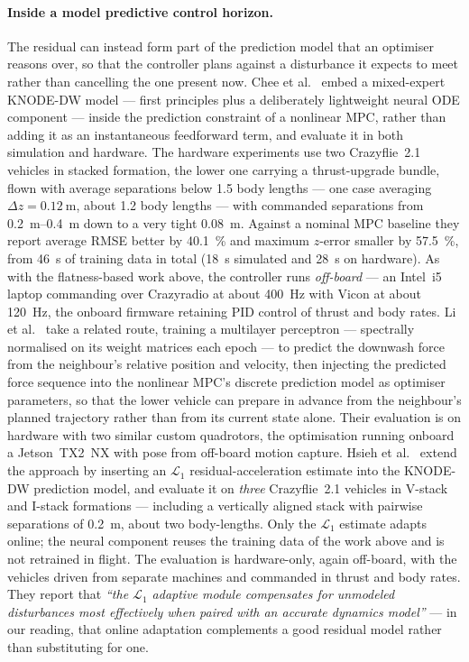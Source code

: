 \paragraph{Inside a model predictive control horizon.}
The residual can instead form part of the prediction model that an optimiser reasons over, so that
the controller plans against a disturbance it expects to meet rather than cancelling the one
present now. Chee et al.~\cite{chee2024knodedwmpc} embed a mixed-expert KNODE-DW model --- first
principles plus a deliberately lightweight neural ODE component --- inside the prediction
constraint of a nonlinear MPC, rather than adding it as an instantaneous feedforward term, and
evaluate it in both simulation and hardware. The hardware experiments use two Crazyflie~2.1
vehicles in stacked formation, the lower one carrying a thrust-upgrade bundle, flown with average
separations below \num{1.5} body lengths --- one case averaging \(\Delta z = \SI{0.12}{\metre}\),
about \num{1.2} body lengths --- with commanded separations from \SIrange{0.2}{0.4}{\metre} down to
a very tight \SI{0.08}{\metre}. Against a nominal MPC baseline they report average RMSE better by
\SI{40.1}{\percent} and maximum \(z\)-error smaller by \SI{57.5}{\percent}, from \SI{46}{\second}
of training data in total (\SI{18}{\second} simulated and \SI{28}{\second} on hardware). As with
the flatness-based work above, the controller runs \emph{off-board} --- an Intel~i5 laptop
commanding over Crazyradio at about \SI{400}{\hertz} with Vicon at about \SI{120}{\hertz}, the
onboard firmware retaining PID control of thrust and body rates.
Li et al.~\cite{li2023ndpnmpc} take a related route, training a multilayer perceptron --- spectrally
normalised on its weight matrices each epoch --- to predict the downwash force from the neighbour's
relative position and velocity, then injecting the predicted force sequence into the nonlinear MPC's
discrete prediction model as optimiser parameters, so that the lower vehicle can prepare in advance
from the neighbour's planned trajectory rather than from its current state alone. Their evaluation
is on hardware with two similar custom quadrotors, the optimisation running onboard a Jetson~TX2~NX
with pose from off-board motion capture. Hsieh et
al.~\cite{hsieh2025onlineadaptation} extend the approach by inserting an $\mathcal{L}_1$
residual-acceleration estimate into the KNODE-DW prediction model, and evaluate it on \emph{three}
Crazyflie~2.1 vehicles in V-stack and I-stack formations --- including a vertically aligned stack
with pairwise separations of \SI{0.2}{\metre}, about two body-lengths. Only the $\mathcal{L}_1$
estimate adapts online; the neural component reuses the training data of the work above and is not
retrained in flight. The evaluation is hardware-only, again off-board, with the vehicles driven
from separate machines and commanded in thrust and body rates. They report that \emph{``the
$\mathcal{L}_1$ adaptive module compensates for unmodeled disturbances most effectively when paired
with an accurate dynamics model''} --- in our reading, that online adaptation complements a good
residual model rather than substituting for one.


